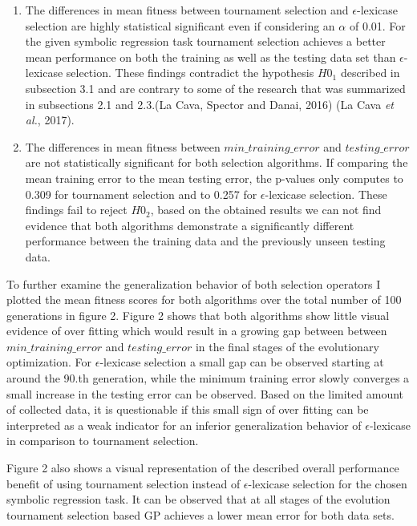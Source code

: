 \documentclass[
  12pt,
]{article}
\begin{document}
\begin{enumerate}
\def\labelenumi{\arabic{enumi}.}
\item
  The differences in mean fitness between tournament selection and
  \(\epsilon\)-lexicase selection are highly statistical significant
  even if considering an \(\alpha\) of 0.01. For the given symbolic
  regression task tournament selection achieves a better mean
  performance on both the training as well as the testing data set than
  \(\epsilon\)-lexicase selection. These findings contradict the
  hypothesis \(H0_{1}\) described in subsection 3.1 and are contrary to
  some of the research that was summarized in subsections 2.1 and
  2.3.(La Cava, Spector and Danai, 2016) (La Cava \emph{et al.}, 2017).
\item
  The differences in mean fitness between \(min\_training\_error\) and
  \(testing\_error\) are not statistically significant for both
  selection algorithms. If comparing the mean training error to the mean
  testing error, the p-values only computes to 0.309 for tournament
  selection and to 0.257 for \(\epsilon\)-lexicase selection. These
  findings fail to reject \(H0_{2}\), based on the obtained results we
  can not find evidence that both algorithms demonstrate a significantly
  different performance between the training data and the previously
  unseen testing data.
\end{enumerate}

To further examine the generalization behavior of both selection
operators I plotted the mean fitness scores for both algorithms over the
total number of 100 generations in figure 2. Figure 2 shows that both
algorithms show little visual evidence of over fitting which would
result in a growing gap between between \(min\_training\_error\) and
\(testing\_error\) in the final stages of the evolutionary optimization.
For \(\epsilon\)-lexicase selection a small gap can be observed starting
at around the 90.th generation, while the minimum training error slowly
converges a small increase in the testing error can be observed. Based
on the limited amount of collected data, it is questionable if this
small sign of over fitting can be interpreted as a weak indicator for an
inferior generalization behavior of \(\epsilon\)-lexicase in comparison
to tournament selection.

Figure 2 also shows a visual representation of the described overall
performance benefit of using tournament selection instead of
\(\epsilon\)-lexicase selection for the chosen symbolic regression task.
It can be observed that at all stages of the evolution tournament
selection based GP achieves a lower mean error for both data sets.
\end{document}
